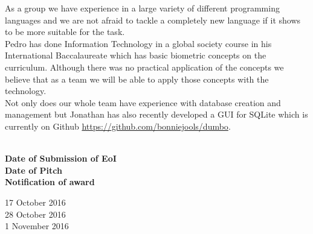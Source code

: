 \documentclass[11pt, oneside]{article}
\begin{document}
As a group we have experience in a large variety of different programming languages and we are not afraid to tackle a completely new language if it shows to be more suitable for the task. \\
Pedro has done Information Technology in a global society course in his International Baccalaureate which has basic biometric concepts on the curriculum. Although there was no practical application of the concepts we believe that as a team we will be able to apply those concepts with the technology.\\

Not only does our whole team have experience with database creation and management but Jonathan has also recently developed a GUI for SQLite which is currently on Github \url{https://github.com/bonniejools/dumbo}.\\ \\
\begin{minipage}[t]{0.5\textwidth}
    \textbf{Date of Submission of EoI}\\
    \textbf{Date of Pitch}\\
    \textbf{Notification of award}\\

\end{minipage}
\begin{minipage}[t]{0.5\textwidth}
    17 October 2016\\
    28 October 2016\\
    1 November 2016\\
\end{minipage}
\end{document}
